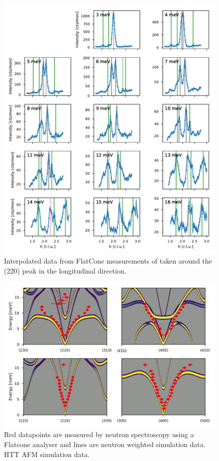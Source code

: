 \begin{figure}
    \centering
    \includegraphics[width=\textwidth]{fig/lowen/fits_220L.pdf}
    \caption[220L flatcone raw data]{Interpolated data from FlatCone measurements of \LSCOOsix{} taken around the (220) peak in the longitudinal direction.}
    \label{fig:flatcone_phonons_220L_raw}    
\end{figure}

\begin{figure}[]
    \centering
    \includegraphics[width=\textwidth]{fig/lowen/flatcone_fits_simulation_htt_afm.png}
    \caption[Flatcone dispersion and neutron weighted simulation data]{Red datapoints are measured  by neutron spectroscopy using a Flatcone analyser  and lines are neutron weighted simulation data. HTT AFM simulation data.}
    \label{fig:flatcone_phonons_dispersion_simulation_e1}
\end{figure}

